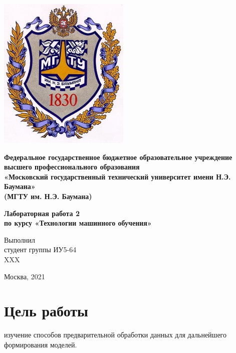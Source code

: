 \documentclass[a4paper]{article}
\begin{document}
  \fontsize{14}{16}\selectfont

  \begin{titlepage}
    \begin{minipage}{0.2\textwidth}
      \includegraphics[scale=0.4]{logo}
    \end{minipage}
    \begin{minipage}{0.7\textwidth}\centering
      \fontsize{10}{12}\selectfont
      \textbf{
        Федеральное государственное бюджетное образовательное учреждение \\
        высшего профессионального образования \\
        «Московский государственный технический университет имени Н.Э. Баумана» \\
        (МГТУ им. Н.Э. Баумана)
      }
    \end{minipage}

    \vspace{5cm}
    \centering
    \textbf{
      Лабораторная работа 2 \\
      по курсу «Технологии машинного обучения» \\
    }

    \vspace{5cm}
    \begin{flushright}
    Выполнил \\
    студент группы ИУ5-64 \\
    XXX
    \end{flushright}
    \vspace*{\fill}
    Москва, 2021
  \end{titlepage}

  \section*{Цель работы}
  изучение способов предварительной обработки данных для дальнейшего формирования моделей.
\end{document}
